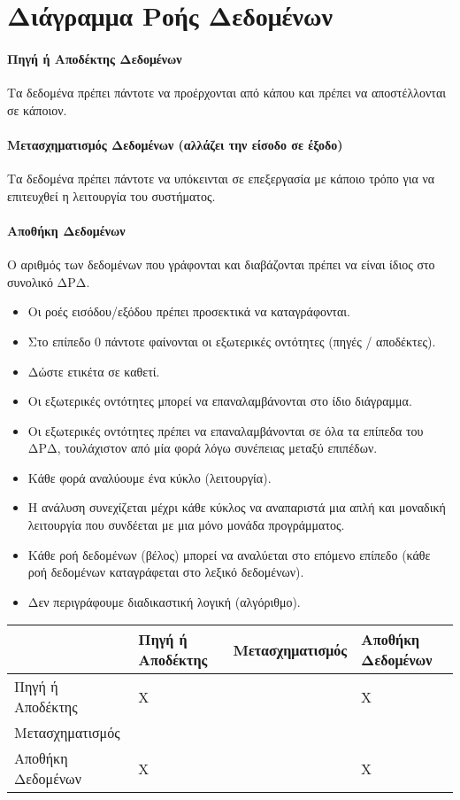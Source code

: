 \section{Διάγραμμα Ροής Δεδομένων}

\paragraph{Πηγή ή Αποδέκτης Δεδομένων}
Τα δεδομένα πρέπει πάντοτε να προέρχονται από κάπου και πρέπει να αποστέλλονται σε κάποιον.

\paragraph{Μετασχηματισμός Δεδομένων (αλλάζει την είσοδο σε έξοδο)}
Τα δεδομένα πρέπει πάντοτε να υπόκεινται σε επεξεργασία με
κάποιο τρόπο για να επιτευχθεί η λειτουργία του συστήματος.

\paragraph{Αποθήκη Δεδομένων}
Ο αριθμός των δεδομένων που γράφονται και διαβάζονται πρέπει να είναι ίδιος
στο συνολικό ΔΡΔ.

\begin{itemize}
	\item	Οι ροές εισόδου/εξόδου πρέπει προσεκτικά να καταγράφονται.
	\item	Στο επίπεδο 0 πάντοτε φαίνονται οι εξωτερικές οντότητες (πηγές / αποδέκτες).
	\item	Δώστε ετικέτα σε καθετί.
	\item	Οι εξωτερικές οντότητες μπορεί να επαναλαμβάνονται στο ίδιο διάγραμμα.
	\item	Οι εξωτερικές οντότητες  πρέπει να επαναλαμβάνονται σε όλα τα επίπεδα του ΔΡΔ,
		τουλάχιστον από μία φορά λόγω συνέπειας μεταξύ επιπέδων.
	\item	Κάθε φορά αναλύουμε ένα κύκλο (λειτουργία).
	\item	Η ανάλυση συνεχίζεται μέχρι κάθε κύκλος να αναπαριστά μια απλή και μοναδική λειτουργία 
		που συνδέεται με μια μόνο μονάδα προγράμματος.
	\item	Κάθε ροή δεδομένων (βέλος) μπορεί να αναλύεται στο επόμενο επίπεδο 
		(κάθε ροή δεδομένων καταγράφεται στο λεξικό δεδομένων).
	\item	Δεν περιγράφουμε διαδικαστική λογική (αλγόριθμο).
\end{itemize}

\begin{tabularx}{0.9\textwidth}{|X|X|X|X|}
	\hline
	{} & {Πηγή ή Αποδέκτης} & {Μετασχηματισμός} & {Αποθήκη Δεδομένων} \\
	\hline
	{Πηγή ή Αποδέκτης} & {X} & {\checkmark} & {X} \\
	\hline
	{Μετασχηματισμός} & {\checkmark} & {\checkmark} & {\checkmark} \\
	\hline
	{Αποθήκη Δεδομένων} & {X} & {\checkmark} & {X} \\
	\hline
\end{tabularx}

